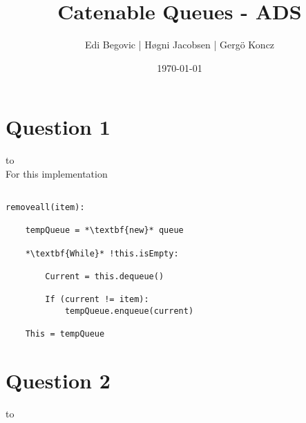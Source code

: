 \documentclass[a4paper]{article}
\title{Catenable Queues - ADS}
\author{Edi Begovic | Høgni Jacobsen | Gergö Koncz}
\date{\today}
\def\headline#1{\hbox to \hsize{\hrulefill\quad\lower.3em\hbox{#1}\quad\hrulefill}}
\begin{document}
 
\maketitle

\section*{Question 1}
\headline{-} \ \\

\noindent
For this implementation 

\begin{lstlisting}[escapeinside={{*}{*}}]

removeall(item):

    tempQueue = *\textbf{new}* queue

    *\textbf{While}* !this.isEmpty:

        Current = this.dequeue()
        
        If (current != item):
            tempQueue.enqueue(current)
    
    This = tempQueue

\end{lstlisting}

\section*{Question 2}
\headline{-} \ \\
\end{document}
